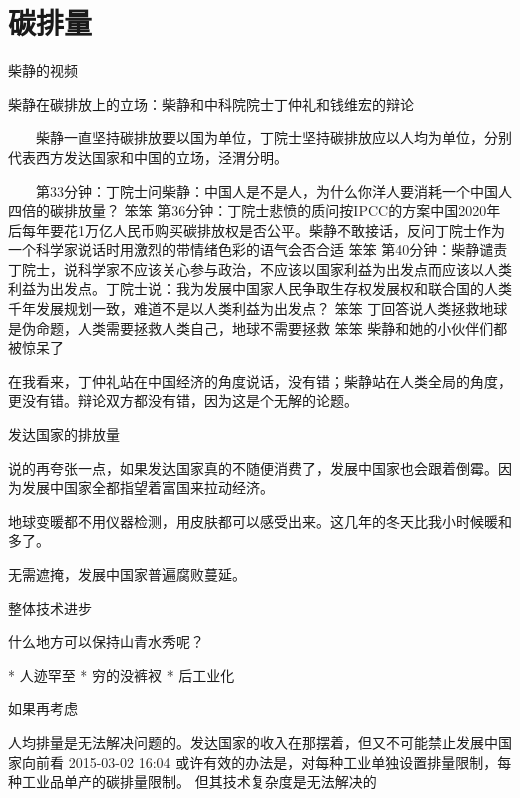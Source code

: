 \chapter{碳排量}
柴静的视频

柴静在碳排放上的立场：柴静和中科院院士丁仲礼和钱维宏的辩论

　　柴静一直坚持碳排放要以国为单位，丁院士坚持碳排放应以人均为单位，分别代表西方发达国家和中国的立场，泾渭分明。

　　第33分钟：丁院士问柴静：中国人是不是人，为什么你洋人要消耗一个中国人四倍的碳排放量？
 笨笨 
第36分钟：丁院士悲愤的质问按IPCC的方案中国2020年后每年要花1万亿人民币购买碳排放权是否公平。柴静不敢接话，反问丁院士作为一个科学家说话时用激烈的带情绪色彩的语气会否合适
 笨笨 
第40分钟：柴静谴责丁院士，说科学家不应该关心参与政治，不应该以国家利益为出发点而应该以人类利益为出发点。丁院士说：我为发展中国家人民争取生存权发展权和联合国的人类千年发展规划一致，难道不是以人类利益为出发点？
 笨笨 
丁回答说人类拯救地球是伪命题，人类需要拯救人类自己，地球不需要拯救
 笨笨 
柴静和她的小伙伴们都被惊呆了

在我看来，丁仲礼站在中国经济的角度说话，没有错；柴静站在人类全局的角度，更没有错。辩论双方都没有错，因为这是个无解的论题。

发达国家的排放量

说的再夸张一点，如果发达国家真的不随便消费了，发展中国家也会跟着倒霉。因为发展中国家全都指望着富国来拉动经济。

地球变暖都不用仪器检测，用皮肤都可以感受出来。这几年的冬天比我小时候暖和多了。

无需遮掩，发展中国家普遍腐败蔓延。

整体技术进步

什么地方可以保持山青水秀呢？

* 人迹罕至
* 穷的没裤衩
* 后工业化

如果再考虑

人均排量是无法解决问题的。发达国家的收入在那摆着，但又不可能禁止发展中国家向前看
2015-03-02 16:04
或许有效的办法是，对每种工业单独设置排量限制，每种工业品单产的碳排量限制。
但其技术复杂度是无法解决的
